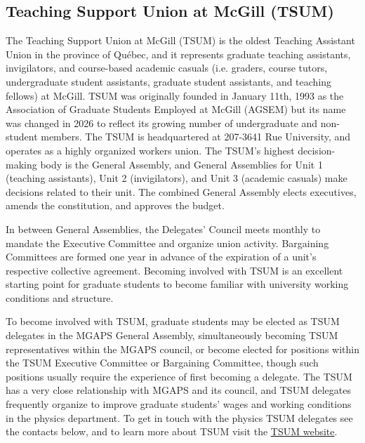 \subsection{Teaching Support Union at McGill (TSUM)}
The Teaching Support Union at McGill (TSUM) is the oldest Teaching Assistant Union in the province of Québec, and it represents graduate teaching assistants, invigilators, and course-based academic casuals (i.e. graders, course tutors, undergraduate student assistants, graduate student assistants, and teaching fellows) at McGill. TSUM was originally founded in January 11th, 1993 as the Association of Graduate Students Employed at McGill (AGSEM) but its name was changed in 2026 to reflect its growing number of undergraduate and non-student members. The TSUM is headquartered at 207-3641 Rue University, and operates as a highly organized workers union. The TSUM's highest decision-making body is the General Assembly, and General Assemblies for Unit 1 (teaching assistants), Unit 2 (invigilators), and Unit 3 (academic casuals) make decisions related to their unit. The combined General Assembly elects executives, amends the constitution, and approves the budget. 

In between General Assemblies, the Delegates' Council meets monthly to mandate the Executive Committee and organize union activity. Bargaining Committees are formed one year in advance of the expiration of a unit's respective collective agreement. Becoming involved with TSUM is an excellent starting point for graduate students to become familiar with university working conditions and structure. 

To become involved with TSUM, graduate students may be elected as TSUM delegates in the MGAPS General Assembly, simultaneously becoming TSUM representatives within the MGAPS council, or become elected for positions within the TSUM Executive Committee or Bargaining Committee, though such positions usually require the experience of first becoming a delegate. The TSUM has a very close relationship with MGAPS and its council, and TSUM delegates frequently organize to improve graduate students' wages and working conditions in the physics department. To get in touch with the physics TSUM delegates see the contacts below, and to learn more about TSUM visit the \href{https://www.agsem.ca}{TSUM website}.

